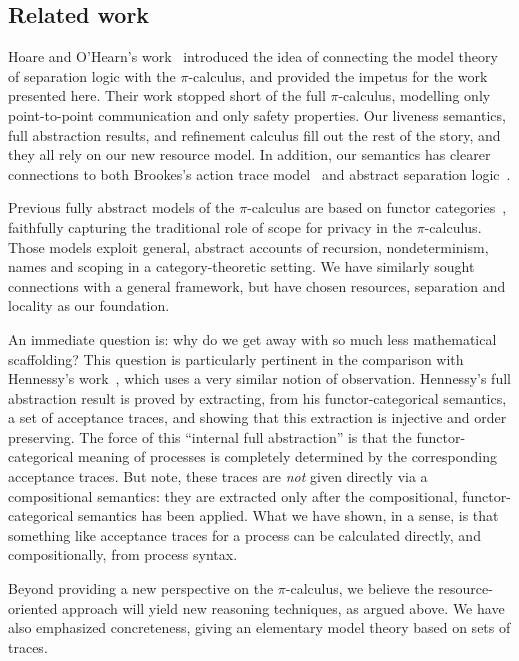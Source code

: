 \documentclass{entcs}
\begin{document}
\subsection{Related work}
\label{sec:related}

Hoare and O'Hearn's work~\cite{Hoare2008} introduced the idea of
connecting the model theory of separation logic with the
$\pi$-calculus, and provided the impetus for the work presented here.
Their work stopped short of the full $\pi$-calculus, modelling only
point-to-point communication and only safety properties.  Our liveness
semantics, full abstraction results, and refinement calculus fill out
the rest of the story, and they all rely on our new resource model.
In addition, our semantics has clearer connections to both Brookes's
action trace model~\cite{Brookes2002} and abstract separation
logic~\cite{Calcagno2007}.

Previous fully abstract models of the $\pi$-calculus are based on
functor categories~\cite{Stark2002,Hennessy2002,Fiore2002}, faithfully
capturing the traditional role of scope for privacy in the
$\pi$-calculus.  Those models exploit general, abstract accounts of
recursion, nondeterminism, names and scoping in a category-theoretic
setting.  We have similarly sought connections with a general
framework, but have chosen resources, separation and locality as our
foundation.  

An immediate question is: why do we get away with so much less
mathematical scaffolding?  This question is particularly pertinent in
the comparison with Hennessy's work~\cite{Hennessy2002}, which uses a
very similar notion of observation.  Hennessy's full abstraction
result is proved by extracting, from his functor-categorical
semantics, a set of acceptance traces, and showing that this
extraction is injective and order preserving.  The force of this
``internal full abstraction'' is that the functor-categorical meaning
of processes is completely determined by the corresponding acceptance
traces.  But note, these traces are \emph{not} given directly via a
compositional semantics: they are extracted only after the
compositional, functor-categorical semantics has been applied.  What
we have shown, in a sense, is that something like acceptance traces
for a process can be calculated directly, and compositionally, from
process syntax.

Beyond providing a new perspective on the $\pi$-calculus,
we believe the resource-oriented approach will yield new reasoning
techniques, as argued above.  We have also emphasized concreteness,
giving an elementary model theory based on sets of traces.
\end{document}
